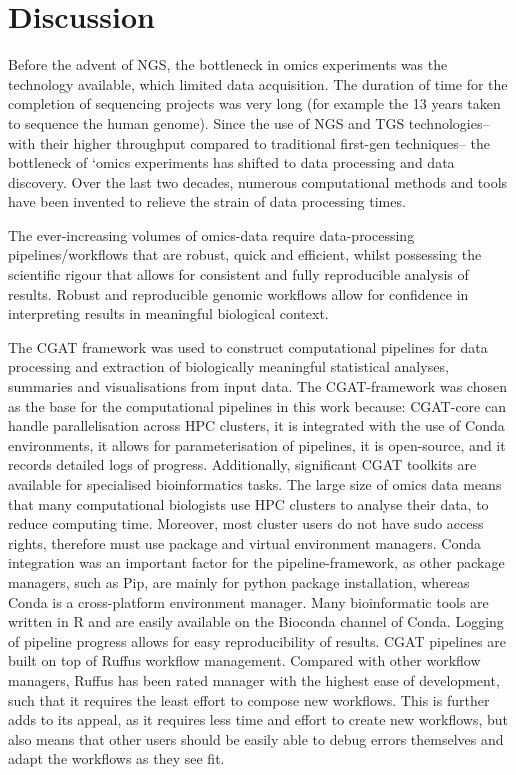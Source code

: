 \afterpage{\clearpage}


\afterpage{\clearpage}


\section{Discussion}

Before the advent of NGS, the bottleneck in omics experiments was the technology available, which limited data acquisition.
The duration of time for the completion of sequencing projects was very long (for example the 13 years taken to sequence the human genome).
Since the use of NGS and TGS technologies-- with their higher throughput compared to traditional first-gen techniques-- the bottleneck of `omics experiments has shifted to data processing and data discovery.
Over the last two decades, numerous computational methods and tools have been invented to relieve the strain of data processing times.

The ever-increasing volumes of omics-data require data-processing pipelines/workflows that are robust, quick and efficient, whilst possessing the scientific rigour that allows for consistent and fully reproducible analysis of results.
Robust and reproducible genomic workflows allow for confidence in interpreting results in meaningful biological context.

The CGAT framework was used to construct computational pipelines for data processing and extraction of biologically meaningful statistical analyses, summaries and visualisations from input data.
The CGAT-framework was chosen as the base for the computational pipelines in this work because: CGAT-core can handle parallelisation across HPC clusters, it is integrated with the use of Conda environments, it allows for parameterisation of pipelines, it is open-source, and it records detailed logs of progress.
Additionally, significant CGAT toolkits are available for specialised bioinformatics tasks. The large size of omics data means that many computational biologists use HPC clusters to analyse their data, to reduce computing time.
Moreover, most cluster users do not have sudo access rights, therefore must use package and virtual environment managers.
Conda integration was an important factor for the pipeline-framework, as other package managers, such as Pip, are mainly for python package installation, whereas Conda is a cross-platform environment manager.
Many bioinformatic tools are written in R and are easily available on the Bioconda channel of Conda. Logging of pipeline progress allows for easy reproducibility of results. CGAT pipelines are built on top of Ruffus workflow management.
Compared with other workflow managers, Ruffus has been rated manager with the highest ease of development, such that it requires the least effort to compose new workflows\cite{leipzig2017review}.
This is further adds to its appeal, as it requires less time and effort to create new workflows, but also means that other users should be easily able to debug errors themselves and adapt the workflows as they see fit.

